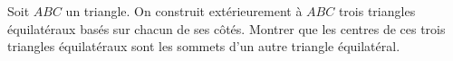 Soit $ABC$ un triangle. On construit extérieurement à $ABC$ trois triangles équilatéraux basés sur chacun de ses côtés. Montrer que les centres de ces trois triangles équilatéraux sont les sommets d'un autre triangle équilatéral.

